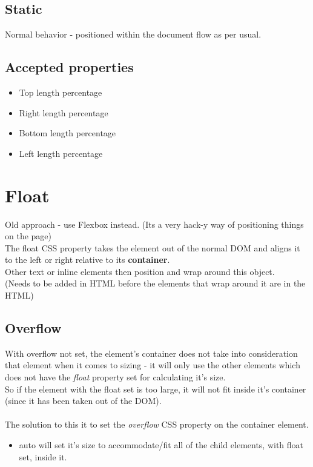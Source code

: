 \documentclass[]{article}
\newcommand{\<}{\guilsinglleft}
\renewcommand{\>}{\guilsinglright}
\renewcommand{\it}[1]{\textit{#1}}
\renewcommand{\bf}[1]{\textbf{#1}}
\begin{document}
\subsection{Static}
Normal behavior - positioned within the document flow as per usual.

\subsection{Accepted properties}
\begin{itemize}
	\item Top
	\subitem \<length\>
	\subitem percentage	
	
	\item Right
	\subitem \<length\>
	\subitem percentage
	
	\item Bottom
	\subitem \<length\>
	\subitem percentage
	
	\item Left	
	\subitem \<length\>
	\subitem percentage
\end{itemize}

\section{Float}
Old approach - use Flexbox instead. (Its a very hack-y way of positioning things on the page)
\\
The float CSS property takes the element out of the normal DOM and aligns it to the left or right relative to its \bf{container}.
\\
Other text or inline elements then position and wrap around this object.
\\
(Needs to be added in HTML before the elements that wrap around it are in the HTML)

\subsection{Overflow}
With overflow not set, the element's container does not take into consideration that element when it comes to sizing - it will only use the other elements which does not have the \it{float} property set for calculating it's size.
\\
So if the element with the float set is too large, it will not fit inside it's container (since it has been taken out of the DOM).
\\\\
The solution to this it to set the \it{overflow} CSS property on the container element. 
\begin{itemize}
	\item auto
	\subitem will set it's size to accommodate/fit all of the child elements, with float set, inside it.
\end{itemize}
\end{document}
